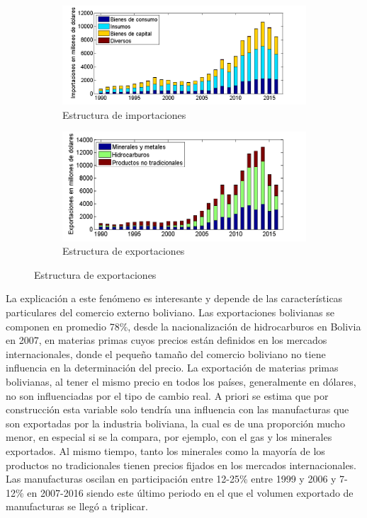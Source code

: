 \documentclass[12pt,letterpaper]{article}
\begin{document}
\begin{figure}
\captionsetup[subfigure]{aboveskip=-2pt,belowskip=-2pt}
\centering
\caption{Estructura de importaciones y exportaciones de Bolivia}\label{impexp}
    \begin{subfigure}[h]{0.65\textwidth}
        \includegraphics[width=\textwidth]{imp9016}
        \caption{Estructura de importaciones}
        \label{mestr}
    \end{subfigure}
    \begin{subfigure}[h]{0.65\textwidth}
        \includegraphics[width=\textwidth]{exp9016}
        \caption{Estructura de exportaciones}
        \label{xestr}
    \end{subfigure}
\end{figure}

La explicación a este fenómeno es interesante y depende de las características particulares del comercio externo boliviano. Las exportaciones bolivianas se componen en promedio 78\%, desde la nacionalización de hidrocarburos en Bolivia en 2007, en materias primas cuyos precios están definidos en los mercados internacionales, donde el pequeño tamaño del comercio boliviano no tiene influencia en la determinación del precio. La exportación de materias primas bolivianas, al tener el mismo precio en todos los países, generalmente en dólares, no son influenciadas por el tipo de cambio real. A priori se estima que por construcción esta variable solo tendría una influencia con las manufacturas que son exportadas por la industria boliviana, la cual es de una proporción mucho menor, en especial si se la compara, por ejemplo, con el gas y los minerales exportados. Al mismo tiempo, tanto los minerales como la mayoría de los productos no tradicionales tienen precios fijados en los mercados internacionales. Las manufacturas oscilan en participación entre 12-25\% entre 1999 y 2006 y 7-12\% en 2007-2016 siendo este último periodo en el que el volumen exportado de manufacturas se llegó a triplicar. 
\end{document}
